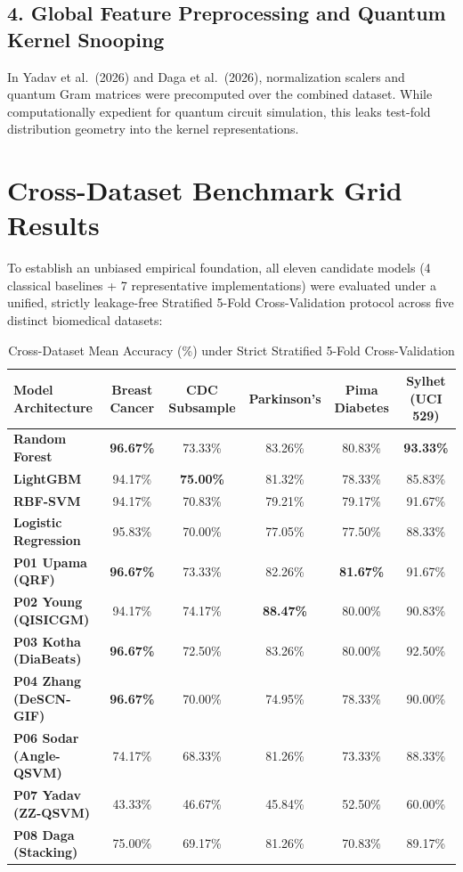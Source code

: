 \documentclass[11pt,a4paper]{article}
\begin{document}
\subsection{4. Global Feature Preprocessing and Quantum Kernel Snooping}
In Yadav et al.\ (2026) and Daga et al.\ (2026), normalization scalers and quantum Gram matrices were precomputed over the combined dataset. While computationally expedient for quantum circuit simulation, this leaks test-fold distribution geometry into the kernel representations.

\section{Cross-Dataset Benchmark Grid Results}
To establish an unbiased empirical foundation, all eleven candidate models (4 classical baselines + 7 representative implementations) were evaluated under a unified, strictly leakage-free Stratified 5-Fold Cross-Validation protocol across five distinct biomedical datasets:

\begin{table}[h!]
\centering
\small
\caption{Cross-Dataset Mean Accuracy (\%) under Strict Stratified 5-Fold Cross-Validation}
\begin{tabular}{lccccc}
\toprule
\textbf{Model Architecture} & \textbf{Breast Cancer} & \textbf{CDC Subsample} & \textbf{Parkinson's} & \textbf{Pima Diabetes} & \textbf{Sylhet (UCI 529)} \\
\midrule
\textbf{Random Forest}        & \textbf{96.67\%} & 73.33\% & 83.26\% & 80.83\% & \textbf{93.33\%} \\
\textbf{LightGBM}             & 94.17\% & \textbf{75.00\%} & 81.32\% & 78.33\% & 85.83\% \\
\textbf{RBF-SVM}              & 94.17\% & 70.83\% & 79.21\% & 79.17\% & 91.67\% \\
\textbf{Logistic Regression}  & 95.83\% & 70.00\% & 77.05\% & 77.50\% & 88.33\% \\
\midrule
\textbf{P01 Upama (QRF)}      & \textbf{96.67\%} & 73.33\% & 82.26\% & \textbf{81.67\%} & 91.67\% \\
\textbf{P02 Young (QISICGM)}  & 94.17\% & 74.17\% & \textbf{88.47\%} & 80.00\% & 90.83\% \\
\textbf{P03 Kotha (DiaBeats)} & \textbf{96.67\%} & 72.50\% & 83.26\% & 80.00\% & 92.50\% \\
\textbf{P04 Zhang (DeSCN-GIF)}& \textbf{96.67\%} & 70.00\% & 74.95\% & 78.33\% & 90.00\% \\
\textbf{P06 Sodar (Angle-QSVM)}& 74.17\% & 68.33\% & 81.26\% & 73.33\% & 88.33\% \\
\textbf{P07 Yadav (ZZ-QSVM)}  & 43.33\% & 46.67\% & 45.84\% & 52.50\% & 60.00\% \\
\textbf{P08 Daga (Stacking)}  & 75.00\% & 69.17\% & 81.26\% & 70.83\% & 89.17\% \\
\bottomrule
\end{tabular}
\end{table}
\end{document}
